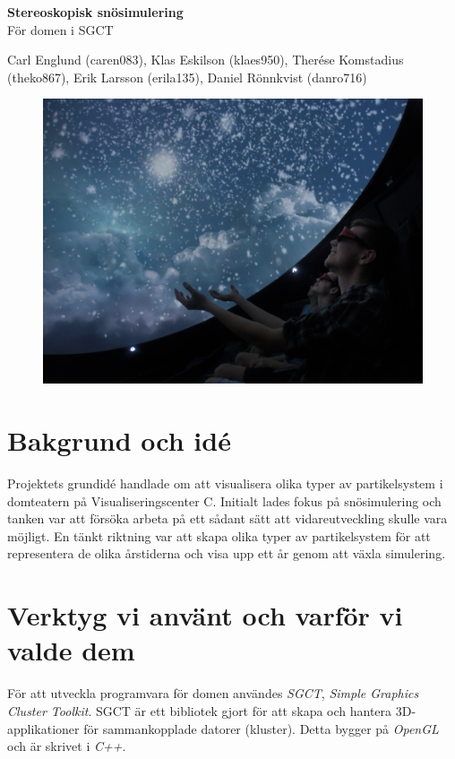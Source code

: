 \documentclass[12pt,a4paper]{article}
\begin{document}
\begin{center}

	{ \huge \bfseries Stereoskopisk snösimulering \\[0.2cm] }
		För domen i SGCT
		\vskip 0.4cm

	\begin{minipage}{0.8\textwidth}
	\centering
		Carl Englund (caren083),
		Klas Eskilson (klaes950),
		Therése Komstadius (theko867),
		Erik Larsson (erila135),
		Daniel Rönnkvist (danro716)
	\end{minipage}

\end{center}

\begin{figure}[h!]
	\centering
		\includegraphics[width=1\textwidth]{modellcarl.jpg}
\end{figure}

\section*{Bakgrund och idé}

	Projektets grundidé handlade om att visualisera olika typer av partikelsystem i domteatern på Visualiseringscenter C. Initialt lades fokus på snösimulering och tanken var att försöka arbeta på ett sådant sätt att vidareutveckling skulle vara möjligt. En tänkt riktning var att skapa olika typer av partikelsystem för att representera de olika årstiderna och visa upp ett år genom att växla simulering.

\section*{Verktyg vi använt och varför vi valde dem}
	För att utveckla programvara för domen användes \emph{SGCT}, \emph{Simple Graphics Cluster Toolkit}. SGCT är ett bibliotek gjort för att skapa och hantera 3D-applikationer för sammankopplade datorer (kluster). Detta bygger på \emph{OpenGL} och är skrivet i \emph{C++}.
\end{document}
